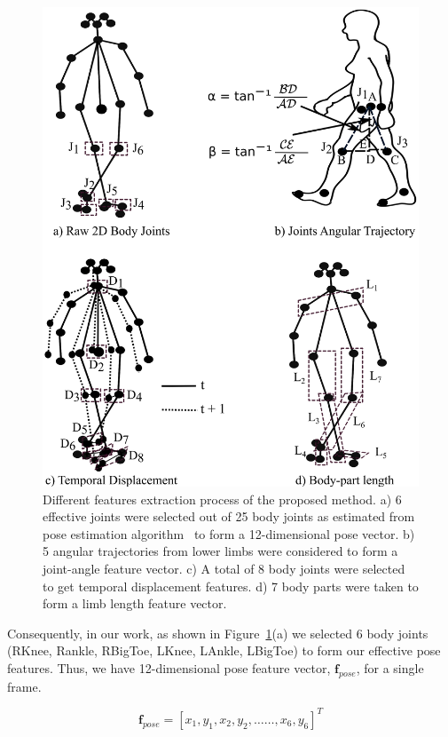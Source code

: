 \begin{figure}
	\centering 
	\includegraphics[width = 120mm]{figures/extracted_features.eps}
	\caption{
	Different features extraction process of the proposed method. a) 6 effective joints were selected out of 25 body joints as estimated from pose estimation algorithm~\cite{Cao_19} to form a 12-dimensional pose vector. b) 5 angular trajectories from lower limbs were considered to form a joint-angle feature vector. c) A total of 8 body joints were selected to get temporal displacement features. d) 7 body parts were taken to form a limb length feature vector.
	}
	\label{fig:extracted_features}
\end{figure}

Consequently, in our work, as shown in Figure~\ref{fig:extracted_features}(a) we selected 6 body joints (RKnee, Rankle, RBigToe, LKnee, LAnkle, LBigToe) to form our effective pose features. Thus, we have 12-dimensional pose feature vector, $\textbf{f}_{pose}$, for a single frame. 

\begin{equation}
  \textbf {f}_{pose}= [x_1, y_1, x_2, y_2, \ldots\ldots, x_6, y_6]^T
\end{equation}

